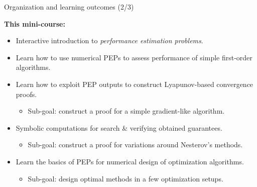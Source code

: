 \documentclass[aspectratio=169]{beamer}
\begin{document}
\begin{frame}{Organization and learning outcomes (2/3)}

\textbf{This mini-course:}

\begin{itemize} 
    \item Interactive introduction to \emph{performance estimation problems}.
    \item Learn how to use numerical PEPs to assess performance of simple first-order algorithms.
    \item Learn how to exploit PEP outputs to construct Lyapunov-based convergence proofs.
    \begin{itemize}
    	\item Sub-goal: construct a proof for a simple gradient-like algorithm.
    \end{itemize}
    \item Symbolic computations for search \& verifying obtained guarantees.
    \begin{itemize}
    	\item Sub-goal: construct a proof for variations around Nesterov's methods.
    \end{itemize}
    \item Learn the basics of PEPs for numerical design of optimization algorithms.
    \begin{itemize}
    	\item Sub-goal: design optimal methods in a few optimization setups.
    \end{itemize}
\end{itemize}

\end{frame}
\end{document}
